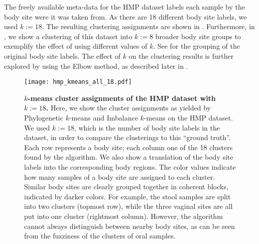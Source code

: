 The freely available meta-data for the \ac{HMP} dataset labels each sample by the body site were it was taken from.
As there are \num{18} different body site labels, we used $k:=18$.
The resulting clustering assignments are shown in .
Furthermore, in ,
we show a clustering of this dataset into $k:=8$ broader body site groups
to exemplify the effect of using different values of $k$.
See  for the grouping of the original body site labels.
The effect of $k$ on the clustering results is further explored by using the Elbow method,
as described later in .

\begin{figure}[hpbt]
    \centering
    \texttt{[image: hmp\_kmeans\_all\_18.pdf]}
    \begin{subfigure}{0pt}
        \label{fig:hmp_kmeans_all_18:sub:em_unconstr}
    \end{subfigure}
    \begin{subfigure}{0pt}
        \label{fig:hmp_kmeans_all_18:sub:ei_unconstr}
    \end{subfigure}
    \caption[$k$-means cluster assignments of the \acs{HMP} dataset with $k:=18$]{
        \textbf{$k$-means cluster assignments of the \acs{HMP} dataset with $k:=18$.}
        Here, we show the cluster assignments as yielded by
         Phylogenetic $k$-means and
         Imbalance $k$-means on the \ac{HMP} dataset.
        We used $k:=18$, which is the number of body site labels in the dataset,
        in order to compare the clusterings to this ``ground truth''.
        Each row represents a body site; each column one of the 18 clusters found by the algorithm.
        We also show a translation of the body site labels into the corresponding body regions.
        The color values indicate how many samples of a body site are assigned to each cluster.
        Similar body sites are clearly grouped together in coherent blocks, indicated by darker colors.
        For example, the stool samples are split into two clusters (topmost row),
        while the three vaginal sites are all put into one cluster (rightmost column).
        However, the algorithm cannot always distinguish between nearby body sites,
        as can be seen from the fuzziness of the clusters of oral samples.
    }
    \label{fig:hmp_kmeans_all_18}
\end{figure}

